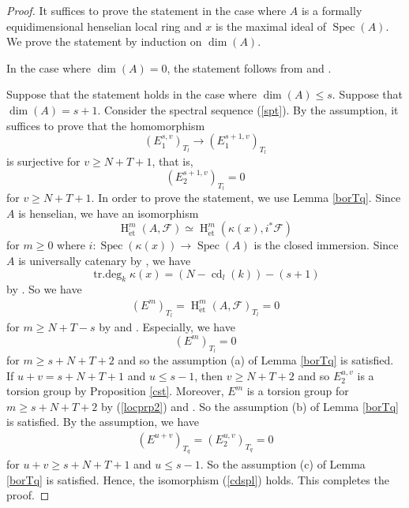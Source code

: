 \documentclass{article}
\newcommand{\spec}{\operatorname{Spec}}
\newcommand{\et}{\mathrm{\acute{e}t}}
\newcommand{\HO}{\operatorname{H}}
\begin{document}
%
\begin{proof}\upshape
It suffices to prove the statement in the case where $A$ is a formally
equidimensional henselian local ring and 
$x$ is the maximal ideal of $\spec(A)$. We prove the statement by induction on
$\operatorname{dim}(A)$.

In the case where $\operatorname{dim}(A)=0$,
the statement follows from
\cite[(3.3.3) Proposition]{N} and
\cite[(6.5.14) Theorem]{N}.

Suppose that the statement holds in the case where
$\operatorname{dim}(A)\leq s$. 
Suppose that 
$\operatorname{dim}(A)=s+1$. Consider the spectral sequence (\ref{spt}).
By the assumption, it suffices to prove that the homomorphism
%
\begin{equation*}
(E_{1}^{s, v})_{T_{l}}
\to
(E_{1}^{s+1, v})_{T_{l}}
\end{equation*}
%
is surjective for $v\geq N+T+1$, that is,
%
\begin{equation}\label{cdspl}
(E_{2}^{s+1, v})_{T_{l}}
=0
\end{equation}
%
for $v\geq N+T+1$.
In order to prove the statement, we use Lemma \ref{borTq}.
Since $A$ is henselian,
we have an isomorphism
%
\begin{equation}\label{locprp2}
\HO^{m}_{\et}(A, \mathcal{F})
\simeq 
\HO^{m}_{\et}
(\kappa(x),
i^{*}\mathcal{F})
\end{equation}
%
for $m\geq 0$
where 
$i: \spec(\kappa(x))\to\spec(A)$
is the closed immersion.
Since $A$ is universally catenary by \cite[p.251, Theorem 31.6 (iv)]{Ma},
we have
%
\begin{equation*}
\operatorname{tr.deg}_{k}\kappa(x)
=(N-\operatorname{cd}_{l}(k))-(s+1)
\end{equation*}
%
by \cite[p.119, Theorem 15.6]{Ma}. So we have
%
\begin{align}\label{VaniEl}
(E^{m})_{T_{l}}=
\HO^{m}_{\et}(A, \mathcal{F})_{T_{l}}
=0    
\end{align}
%
for $m\geq N+T-s$ by
\cite[(6.5.14) Theorem]{N} and \cite[(3.3.3) Proposition]{N}.
Especially, we have
%
\begin{equation*}
(E^{m})_{T_{l}}=0    
\end{equation*}
%
for $m\geq s+N+T+2$
and so the assumption (a) of Lemma \ref{borTq} is satisfied.
If $u+v=s+N+T+1$ and $u\leq s-1$,
then $v\geq N+T+2$ and so $E^{u, v}_{2}$
is a torsion group by Proposition \ref{cst}.
Moreover, $E^{m}$ is a torsion group for $m\geq s+N+T+2$
by (\ref{locprp2}) and \cite[p.180, Theorem 6.5.8]{We}. 
So the assumption (b) of Lemma \ref{borTq} is satisfied.
By the assumption, we have
%
\begin{align*}
(E^{u+v})_{T_{q}}
=
(E^{u, v}_{2})_{T_{q}}
=0
\end{align*}
%
for $u+v\geq s+N+T+1$ and
$u\leq s-1$. So the assumption (c) of Lemma \ref{borTq}
is satisfied. Hence, the isomorphism (\ref{cdspl}) holds.
This completes the proof.

\end{proof}
%
\end{document}
